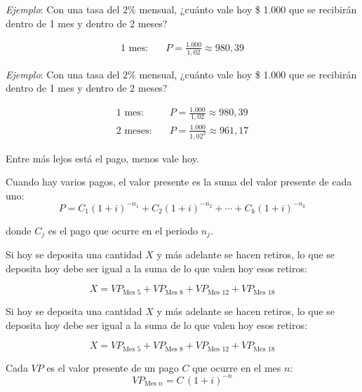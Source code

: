 \documentclass{beamer}
\begin{document}
  \begin{frame}
    \textit{Ejemplo}: Con una tasa del $2\%$ mensual, ¿cuánto vale hoy \$ 1.000
    que se recibirán dentro de 1 mes y dentro de 2 meses?

    \begin{equation*}
      \begin{aligned}
        \text{1 mes:} \quad & P = \frac{1.000}{1{,}02} \approx 980{,}39
      \end{aligned}
    \end{equation*}
  \end{frame}

  \begin{frame}
    \textit{Ejemplo}: Con una tasa del $2\%$ mensual, ¿cuánto vale hoy \$ 1.000
    que se recibirán dentro de 1 mes y dentro de 2 meses?

    \begin{equation*}
      \begin{aligned}
        \text{1 mes:} \quad & P = \frac{1.000}{1{,}02} \approx 980{,}39 \\
        \text{2 meses:} \quad & P = \frac{1.000}{1{,}02^2} \approx 961{,}17
      \end{aligned}
    \end{equation*}

    Entre más lejos está el pago, menos vale hoy.
  \end{frame}

  \begin{frame}
    Cuando hay varios pagos, el valor presente es la suma del valor presente de
    cada uno:
    \[P = C_1(1+i)^{-n_1} + C_2(1+i)^{-n_2} + \cdots + C_k(1+i)^{-n_k}\]

    donde $C_j$ es el pago que ocurre en el periodo $n_j$.
  \end{frame}

  \begin{frame}
    Si hoy se deposita una cantidad $X$ y más adelante se hacen retiros, lo que
    se deposita hoy debe ser igual a la suma de lo que valen hoy esos retiros:

    \begin{equation*}
      X = VP_{\text{Mes 5}} + VP_{\text{Mes 8}} + VP_{\text{Mes 12}} + VP_{\text{Mes 18}}
    \end{equation*}
  \end{frame}

  \begin{frame}
    Si hoy se deposita una cantidad $X$ y más adelante se hacen retiros, lo que
    se deposita hoy debe ser igual a la suma de lo que valen hoy esos retiros:

    \begin{equation*}
      X = VP_{\text{Mes 5}} + VP_{\text{Mes 8}} + VP_{\text{Mes 12}} + VP_{\text{Mes 18}}
    \end{equation*}

    Cada $VP$ es el valor presente de un pago $C$ que ocurre en el mes $n$:
    \[VP_{\text{Mes } n} = C\,(1+i)^{-n}\]
  \end{frame}
\end{document}
